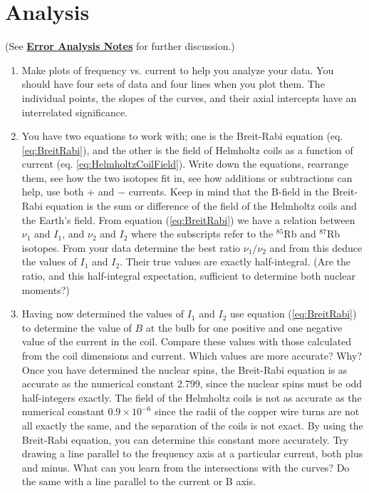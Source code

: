 \documentclass{../lab}
\begin{document}
\section{Analysis}

(See \href{\ErrorAnalysisNotes}{\textbf{Error Analysis Notes}} for further discussion.)

\begin{enumerate}
    \item Make plots of frequency vs. current to help you analyze your data. You should have four sets of data and four lines when you plot them. The individual points, the slopes of the curves, and their axial intercepts have an interrelated significance.

    \item You have two equations to work with; one is the Breit-Rabi equation (eq. \ref{eq:BreitRabi}), and the other is the field of Helmholtz coils as a function of current (eq. \ref{eq:HelmholtzCoilField}). Write down the equations, rearrange them, see how the two isotopes fit in, see how additions or subtractions can help, use both + and $-$ currents. Keep in mind that the B-field in the Breit-Rabi equation is the sum or difference of the field of the Helmholtz coils and the Earth's field. From equation (\ref{eq:BreitRabi}) we have a relation between $\nu_1$ and $I_1$, and $\nu_2$ and $I_2$ where the subscripts refer to the $^{85}$Rb and $^{87}$Rb isotopes. From your data determine the best ratio $\nu_1 / \nu_2$ and from this deduce the values of $I_1$ and $I_2$. Their true values are exactly half-integral. (Are the ratio, and this half-integral expectation, sufficient to determine both nuclear moments?)

\newpage

    \item Having now determined the values of $I_1$ and $I_2$ use equation (\ref{eq:BreitRabi}) to determine the value of $B$ at the bulb for one positive and one negative value of the current in the coil. Compare these values with those calculated from the coil dimensions and current. Which values are more accurate? Why? Once you have determined the nuclear spins, the Breit-Rabi equation is as accurate as the numerical constant 2.799, since the nuclear spins must be odd half-integers exactly. The field of the Helmholtz coils is not as accurate as the numerical constant $0.9 \times 10^{-6}$ since the radii of the copper wire turns are not all exactly the same, and the separation of the coils is not exact. By using the Breit-Rabi equation, you can determine this constant more accurately. Try drawing a line parallel to the frequency axis at a particular current, both plus and minus. What can you learn from the intersections with the curves? Do the same with a line parallel to the current or B axis.


\end{enumerate}
\end{document}
